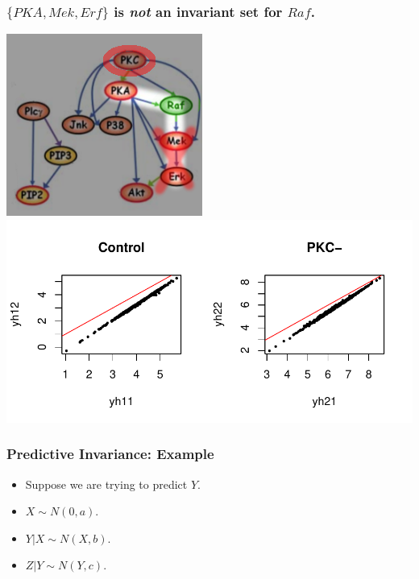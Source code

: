 \documentclass{beamer}
\begin{document}
\begin{frame}
\frametitle{$\{PKA, Mek, Erf\}$ is \emph{not} an invariant set for $Raf$.}
\begin{center}
\includegraphics[scale = 0.3]{../images/fig05_02.png}\hspace{0.5in}
\includegraphics[scale = 0.6]{../images/plot05_01.pdf}
\end{center}
\end{frame}



\begin{frame}
\frametitle{Predictive Invariance: Example}
\begin{center}
\end{center}
\begin{itemize}
\item Suppose we are trying to predict $Y$.
\item $X \sim N(0, a)$.
\item $Y|X \sim N(X, b)$.
\item $Z|Y \sim N(Y, c).$
\end{itemize}
\end{frame}
\end{document}
